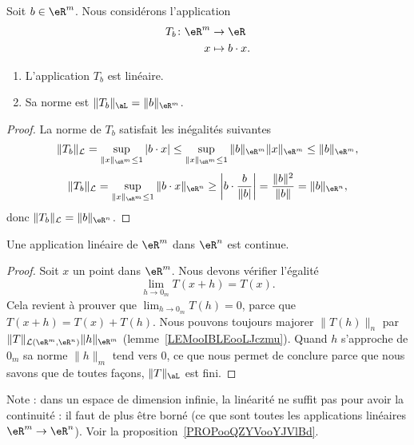 \begin{lemma}       \label{LEMooNWQWooBrpXgn}
	Soit \( b\in \eR^m\). Nous considérons l'application
	\begin{equation}
		\begin{aligned}
			T_b\colon \eR^m & \to \eR           \\
			x               & \mapsto b\cdot x.
		\end{aligned}
	\end{equation}
	\begin{enumerate}
		\item
		      L'application \( T_b\) est linéaire.
		\item
		      Sa norme est \( \| T_b \|_{\aL}=\| b \|_{\eR^m}\).
	\end{enumerate}
\end{lemma}

\begin{proof}
	La norme de \( T_b\) satisfait les inégalités suivantes
	\[
		\|T_b\|_{\mathcal{L}}=\sup_{\|x\|_{\eR^m}\leq 1}|b\cdot x|\leq \sup_{\|x\|_{\eR^m}\leq 1}\|b \|_{\eR^m}\|x\|_{\eR^m}\leq\|b \|_{\eR^m},
	\]
	\[
		\|T_b\|_{\mathcal{L}}=\sup_{\|x\|_{\eR^m}\leq 1}\|b\cdot x\|_{\eR^n}\geq \left|b\cdot \frac{b}{\|b |}\right|=\frac{ \| b \|^2 }{ \| b \| }=\|b \|_{\eR^n},
	\]
	donc \( \|T_b\|_{\mathcal{L}}=\|b \|_{\eR^n}\).
\end{proof}

\begin{proposition}
	Une application linéaire de \( \eR^m\) dans \( \eR^n\) est continue.
\end{proposition}

\begin{proof}
	Soit \( x\) un point dans \( \eR^m\). Nous devons vérifier l'égalité
	\begin{equation}
		\lim_{h\to 0_m}T(x+h)=T(x).
	\end{equation}
	Cela revient à prouver que \( \lim_{h\to 0_m}T(h)=0\), parce que \( T(x+h)=T(x)+T(h)\). Nous pouvons toujours majorer \( \|T(h)\|_n\) par \( \|T\|_{\mathcal{L}(\eR^m,\eR^n)}\| h \|_{\eR^m}\) (lemme~\ref{LEMooIBLEooLJczmu}). Quand \( h\) s'approche de \(  0_m \) sa norme \( \|h\|_m\) tend vers \( 0\), ce que nous permet de conclure parce que nous savons que de toutes façons, \( \| T \|_{\aL}\) est fini.
\end{proof}

Note : dans un espace de dimension infinie, la linéarité ne suffit pas pour avoir la continuité : il faut de plus être borné (ce que sont toutes les applications linéaires \( \eR^m\to\eR^n\)). Voir la proposition~\ref{PROPooQZYVooYJVlBd}.


